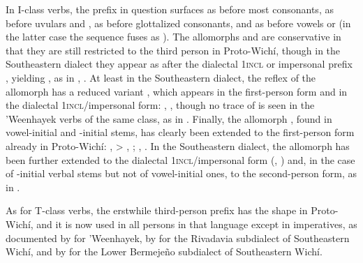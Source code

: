 In I-class verbs, the prefix in question surfaces as  before most consonants, as  before uvulars and , as  before glottalized consonants, and as  before vowels or  (in the latter case the sequence  fuses as ). The allomorphs  and  are conservative in that they are still restricted to the third person in Proto-Wichí, though in the Southeastern dialect they appear as  after the dialectal 1{\textsc{incl}} or impersonal prefix , yielding , as in ,  \citep[241]{VN14}. At least in the Southeastern dialect, the reflex of the allomorph  has a reduced variant , which appears in the first-person form and in the dialectal 1{\textsc{incl}}/impersonal form: ,  \citep[241]{VN14}, though no trace of  is seen in the ’Weenhayek verbs of the same class, as in  \citep[302]{KC16}. Finally, the allomorph , found in vowel-initial and -initial stems, has clearly been extended to the first-person form already in Proto-Wichí: ,  > ,  \citep[116, 532]{KC16}; ,  \citep[241]{VN14}. In the Southeastern dialect, the allomorph  has been further extended to the dialectal 1{\textsc{incl}}/impersonal form (, ) and, in the case of -initial verbal stems but not of vowel-initial ones, to the second-person form, as in  \citep[241]{VN14}.

As for T-class verbs, the erstwhile third-person prefix has the shape  in Proto-Wichí, and it is now used in all persons in that language except in imperatives, as documented by \citet[448]{JAA-KC-14} for ’Weenhayek, by \citet[237]{JT09-th} for the Rivadavia subdialect of Southeastern Wichí, and by \citet[120, 239–240]{VN14} for the Lower Bermejeño subdialect of Southeastern Wichí.

